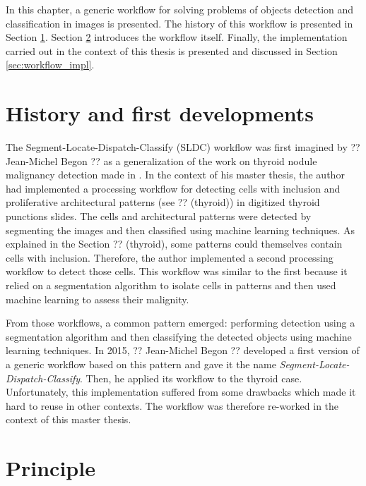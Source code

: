 In this chapter, a generic workflow for solving problems of objects detection and classification in images is presented. The history of this workflow is presented in Section \ref{sec:history_first_dev}. Section \ref{sec:workflow_principle} introduces the workflow itself. Finally, the implementation carried out in the context of this thesis is presented and discussed in Section \ref{sec:workflow_impl}.

\section{History and first developments}
\label{sec:history_first_dev}
The Segment-Locate-Dispatch-Classify (SLDC) workflow was first imagined by ?? Jean-Michel Begon ?? as a generalization of the work on thyroid nodule malignancy detection made in \cite{adeblire2013}. In the context of his master thesis, the author had implemented a processing workflow for detecting cells with inclusion and proliferative architectural patterns (see ?? (thyroid)) in digitized thyroid punctions slides. The cells and architectural patterns were detected by segmenting the images and then classified using machine learning techniques. As explained in the Section ?? (thyroid), some patterns could themselves contain cells with inclusion. Therefore, the author implemented a second processing workflow to detect those cells. This workflow was similar to the first because it relied on a segmentation algorithm to isolate cells in patterns and then used machine learning to assess their malignity. 

From those workflows, a common pattern emerged: performing detection using a segmentation algorithm and then classifying the detected objects using machine learning techniques. In 2015, ?? Jean-Michel Begon ?? developed a first version of a generic workflow based on this pattern and gave it the name \textit{Segment-Locate-Dispatch-Classify}. Then, he applied its workflow to the thyroid case. Unfortunately, this implementation suffered from some drawbacks which made it hard to reuse in other contexts. The workflow was therefore re-worked in the context of this master thesis.

\section{Principle}
\label{sec:workflow_principle}

